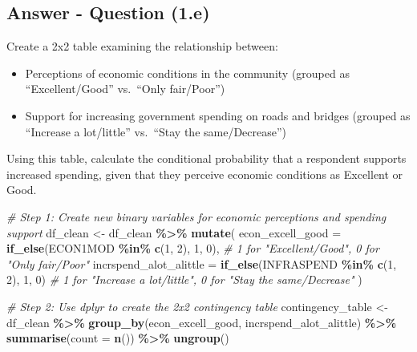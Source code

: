 \documentclass[
  11pt,
]{article}
\newenvironment{Shaded}{\begin{snugshade}}{\end{snugshade}}
\newcommand{\AttributeTok}[1]{\textcolor[rgb]{0.13,0.29,0.53}{#1}}
\newcommand{\CommentTok}[1]{\textcolor[rgb]{0.56,0.35,0.01}{\textit{#1}}}
\newcommand{\DecValTok}[1]{\textcolor[rgb]{0.00,0.00,0.81}{#1}}
\newcommand{\FunctionTok}[1]{\textcolor[rgb]{0.13,0.29,0.53}{\textbf{#1}}}
\newcommand{\NormalTok}[1]{#1}
\newcommand{\OtherTok}[1]{\textcolor[rgb]{0.56,0.35,0.01}{#1}}
\newcommand{\SpecialCharTok}[1]{\textcolor[rgb]{0.81,0.36,0.00}{\textbf{#1}}}
\providecommand{\tightlist}{%
  \setlength{\itemsep}{0pt}\setlength{\parskip}{0pt}}
\begin{document}
\subsection{Answer - Question (1.e)}\label{answer---question-1.e}

Create a 2x2 table examining the relationship between:

\begin{itemize}
\tightlist
\item
  Perceptions of economic conditions in the community (grouped as
  ``Excellent/Good'' vs.~``Only fair/Poor'')
\item
  Support for increasing government spending on roads and bridges
  (grouped as ``Increase a lot/little'' vs.~``Stay the same/Decrease'')
\end{itemize}

Using this table, calculate the conditional probability that a
respondent supports increased spending, given that they perceive
economic conditions as Excellent or Good.

\begin{Shaded}
\begin{Highlighting}[]
\CommentTok{\# Step 1: Create new binary variables for economic perceptions and spending support}
\NormalTok{df\_clean }\OtherTok{\textless{}{-}}\NormalTok{ df\_clean }\SpecialCharTok{\%\textgreater{}\%}
  \FunctionTok{mutate}\NormalTok{(}
    \AttributeTok{econ\_excell\_good =} \FunctionTok{if\_else}\NormalTok{(ECON1MOD }\SpecialCharTok{\%in\%} \FunctionTok{c}\NormalTok{(}\DecValTok{1}\NormalTok{, }\DecValTok{2}\NormalTok{), }\DecValTok{1}\NormalTok{, }\DecValTok{0}\NormalTok{),  }\CommentTok{\# 1 for "Excellent/Good", 0 for "Only fair/Poor"}
    \AttributeTok{incrspend\_alot\_alittle =} \FunctionTok{if\_else}\NormalTok{(INFRASPEND }\SpecialCharTok{\%in\%} \FunctionTok{c}\NormalTok{(}\DecValTok{1}\NormalTok{, }\DecValTok{2}\NormalTok{), }\DecValTok{1}\NormalTok{, }\DecValTok{0}\NormalTok{)  }\CommentTok{\# 1 for "Increase a lot/little", 0 for "Stay the same/Decrease"}
\NormalTok{  )}

\CommentTok{\# Step 2: Use dplyr to create the 2x2 contingency table}
\NormalTok{contingency\_table }\OtherTok{\textless{}{-}}\NormalTok{ df\_clean }\SpecialCharTok{\%\textgreater{}\%}
  \FunctionTok{group\_by}\NormalTok{(econ\_excell\_good, incrspend\_alot\_alittle) }\SpecialCharTok{\%\textgreater{}\%}
  \FunctionTok{summarise}\NormalTok{(}\AttributeTok{count =} \FunctionTok{n}\NormalTok{()) }\SpecialCharTok{\%\textgreater{}\%}
  \FunctionTok{ungroup}\NormalTok{() }
\end{Highlighting}
\end{Shaded}
\end{document}
